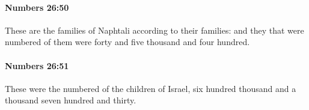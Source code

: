 		\paragraph{Numbers 26:50} %
			\label{NUMBERS-26-50}

			These are the families of Naphtali according to their families: and they that were numbered of them were forty and five thousand and four hundred.


		\paragraph{Numbers 26:51} %
			\label{NUMBERS-26-51}

			These were the numbered of the children of Israel, six hundred thousand and a thousand seven hundred and thirty.


